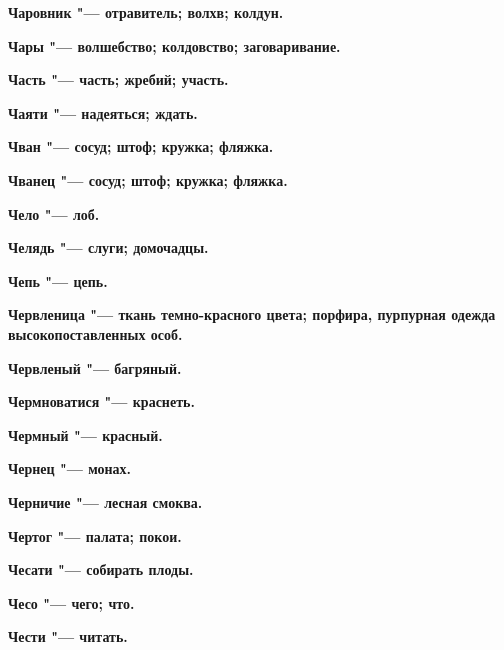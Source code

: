 \begin{multicols}{2}
\bfseries Чаровник\normalfont{} "--- отравитель; волхв; колдун. 




\bfseries Чары\normalfont{} "--- волшебство; колдовство; заговаривание. 




\bfseries Часть\normalfont{} "--- часть; жребий; участь. 




\bfseries Чаяти\normalfont{} "--- надеяться; ждать. 




\bfseries Чван\normalfont{} "--- сосуд; штоф; кружка; фляжка. 




\bfseries Чванец\normalfont{} "--- сосуд; штоф; кружка; фляжка. 




\bfseries Чело\normalfont{} "--- лоб. 




\bfseries Челядь\normalfont{} "--- слуги; домочадцы. 




\bfseries Чепь\normalfont{} "--- цепь. 




\bfseries Червленица\normalfont{} "--- ткань темно-красного цвета; порфира, пурпурная одежда высокопоставленных особ. 




\bfseries Червленый\normalfont{} "--- багряный. 




\bfseries Чермноватися\normalfont{} "--- краснеть. 




\bfseries Чермный\normalfont{} "--- красный. 




\bfseries Чернец\normalfont{} "--- монах. 




\bfseries Черничие\normalfont{} "--- лесная смоква. 




\bfseries Чертог\normalfont{} "--- палата; покои. 




\bfseries Чесати\normalfont{} "--- собирать плоды. 




\bfseries Чесо\normalfont{} "--- чего; что. 




\bfseries Чести\normalfont{} "--- читать. 





\end{multicols}
